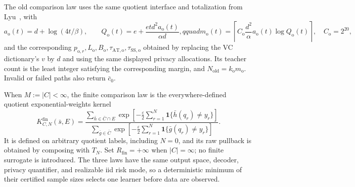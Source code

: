 The old comparison law uses the same quotient interface and totalization
from Lyu~\citep{lyu2025},
with
\[
a_{\mathrm o}(t)=d+\log(4t/\beta),\qquad
Q_{\mathrm o}(t)=e+\frac{etd^2a_{\mathrm o}(t)}{\alpha d},qquad
m_{\mathrm o}(t)=\left\lceil C_{\mathrm o}\frac{d^2}{\alpha}
 a_{\mathrm o}(t)\log Q_{\mathrm o}(t)\right\rceil,
\quad C_{\mathrm o}=2^{20},
\]
and the corresponding
\(p_{\mathrm o,r},L_{\mathrm o},B_{\mathrm o},
\tau_{\mathrm{AT,o}},\tau_{\mathrm{SS,o}}\) obtained by replacing the VC
dictionary's $v$ by $d$ and using the same displayed privacy allocations.
Its teacher count is the least integer satisfying the corresponding margin,
and $N_{\mathrm{old}}=k_{\mathrm o}m_{\mathrm o}$.  Invalid or failed paths
also return $\bar c_0$.

When $M:=|C|<\infty$, the finite comparison law is the everywhere-defined
quotient exponential-weights kernel
\[
K^{\mathrm{fin}}_{C,N}(\bar s,E)=
\frac{\displaystyle\sum_{\bar h\in\bar C\cap E}
 \exp\!\left[-\frac{\varepsilon}{2}\sum_{r=1}^N
 \mathbf1\{\bar h(q_r)\ne y_r\}\right]}
 {\displaystyle\sum_{\bar g\in\bar C}
 \exp\!\left[-\frac{\varepsilon}{2}\sum_{r=1}^N
 \mathbf1\{\bar g(q_r)\ne y_r\}\right]}.
\]
It is defined on arbitrary quotient labels, including $N=0$, and its raw
pullback is obtained by composing with $T_N$.  Set $R_{\mathrm{fin}}=+\infty$
when $|C|=\infty$; no finite surrogate is introduced.  The three laws have
the same output space, decoder, privacy quantifier, and realizable iid risk
mode, so a deterministic minimum of their certified sample sizes selects
one learner before data are observed.
